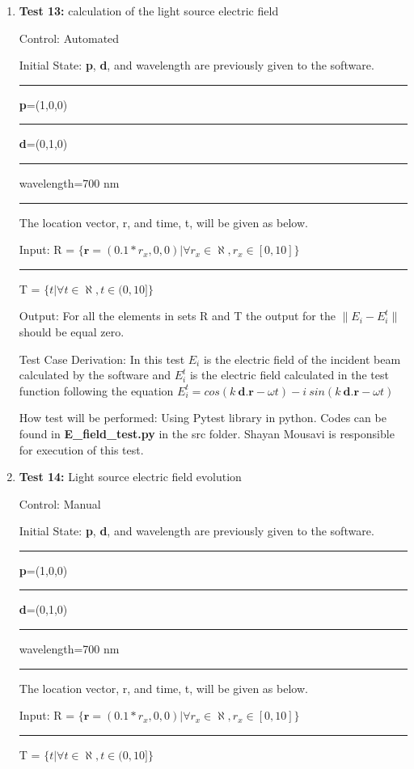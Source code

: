 \documentclass[12pt, titlepage]{article}
\begin{document}
\begin{enumerate}
	
	\item{\textbf{Test 13:} calculation of the light source electric field \\}
	
	Control: Automated 
	
	Initial State:  \textbf{p}, \textbf{d}, and wavelength are previously given to the software. \\
	\rule{2.3cm}{0pt} \textbf{p}=(1,0,0)\\
	\rule{2.3cm}{0pt} \textbf{d}=(0,1,0)\\
	\rule{2.3cm}{0pt} wavelength=700 nm\\
	\rule{2.3cm}{0pt} The location vector, r, and time, t, will be given as below.  
	
	Input: R = $\{\textbf{r}=(0.1*r_x,0,0)| \forall r_x \in \aleph, r_x \in [0,10]\}$\\
	\rule{1.3cm}{0pt}T = $\{t| \forall t \in \aleph, t \in (0,10]\}$
	
	Output: For all the elements in sets R and T the output for the $\|E_i-E_{i}^t\|$ should be equal zero.
	 	
	Test Case Derivation: In this test $E_i$ is the electric field of the incident beam calculated by the software and $E_i^t$ is the electric field calculated in the test function following the equation $E_i^t = cos(k\  \textbf{d.} \textbf{r} - \omega t) - i \ sin(k\  \textbf{d.} \textbf{r} - \omega t)$   
	
	How test will be performed: Using Pytest library in python. Codes can be found in \textbf{E\_field\_test.py } in the src folder. Shayan Mousavi is responsible for execution of this test. 
	
	
\item{\textbf{Test 14:} Light source electric field evolution\\}

Control: Manual 

Initial State:  \textbf{p}, \textbf{d}, and wavelength are previously given to the software. \\
\rule{2.3cm}{0pt} \textbf{p}=(1,0,0)\\
\rule{2.3cm}{0pt} \textbf{d}=(0,1,0)\\
\rule{2.3cm}{0pt} wavelength=700 nm\\
\rule{2.3cm}{0pt} The location vector, r, and time, t, will be given as below.  

Input: R = $\{\textbf{r}=(0.1*r_x,0,0)| \forall r_x \in \aleph, r_x \in [0,10]\}$\\
\rule{1.3cm}{0pt}T = $\{t| \forall t \in \aleph, t \in (0,10]\}$


\end{enumerate}
\end{document}
